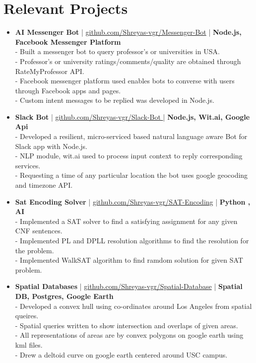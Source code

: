 \section{Relevant Projects}
\begin{itemize}
 \item \textbf{AI Messenger Bot} | \href{https://github.com/Shreyas-vgr/Messenger-Bot}{github.com/Shreyas-vgr/Messenger-Bot} | \textbf{Node.js, Facebook Messenger Platform}\\
 - Built a messenger bot to query professor's or universities in USA.\\
 - Professor's or university ratings/comments/quality are obtained through RateMyProfessor API.\\
 - Facebook messenger platform used enables bots to converse with users through Facebook apps and pages.\\
 - Custom intent messages to be replied was developed in Node.js.

 \item \textbf{Slack Bot} | \href{https://github.com/Shreyas-vgr/Slack-Bot}{github.com/Shreyas-vgr/Slack-Bot }| \textbf{Node.js, Wit.ai, Google Api}\\
 - Developed a resilient, micro-serviced based natural language aware Bot for Slack app with Node.js.\\
 - NLP module, wit.ai used to process input context to reply corresponding services.\\
 - Requesting a time of any particular location the bot uses google geocoding and timezone API. 

 \item \textbf{Sat Encoding Solver} | \href{https://github.com/Shreyas-vgr/SAT-Encoding}{github.com/Shreyas-vgr/SAT-Encoding} | \textbf{Python , AI}\\
 - Implemented a SAT solver to find a satisfying assignment for any given CNF sentences.\\
 - Implemented PL and DPLL resolution algorithms to find the resolution for the problem.\\
 - Implemented WalkSAT algorithm to find ramdom solution for given SAT problem.

  \item \textbf{Spatial Databases} | \href{https://github.com/Shreyas-vgr/Spatial-Database}{github.com/Shreyas-vgr/Spatial-Database} | \textbf{Spatial DB, Postgres, Google Earth}\\
 - Developed a convex hull using co-ordinates around Los Angeles from spatial queires.\\
 - Spatial queries written to show intersection and overlaps of given areas.\\
 - All representations of areas are by convex polygons on google earth using kml files. \\
 - Drew a deltoid curve on google earth centered around USC campus.


\end{itemize}
